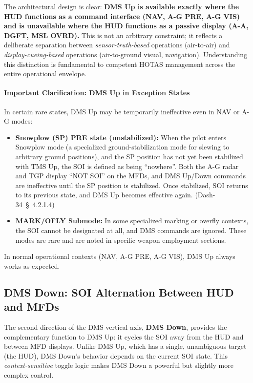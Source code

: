 \documentclass[11pt,a4paper]{article}
\providecommand{\dashref}[1]{Dash-34~\S~#1}
\begin{document}
The architectural design is clear: \textbf{DMS Up is available exactly where the HUD functions as a command interface (NAV, A-G PRE, A-G VIS) and is unavailable where the HUD functions as a passive display (A-A, DGFT, MSL OVRD).} This is not an arbitrary constraint; it reflects a deliberate separation between \textit{sensor-truth-based} operations (air-to-air) and \textit{display-cueing-based} operations (air-to-ground visual, navigation). Understanding this distinction is fundamental to competent HOTAS management across the entire operational envelope.

\paragraph*{Important Clarification: DMS Up in Exception States}

In certain rare states, DMS Up may be temporarily ineffective even in NAV or A-G modes:

\begin{itemize}

\item \textbf{Snowplow (SP) PRE state (unsta­bilized):} When the pilot enters Snowplow mode (a specialized ground-stabilization mode for slewing to arbitrary ground positions), and the SP position has not yet been stabilized with TMS Up, the SOI is defined as being ``nowhere''. Both the A-G radar and TGP display ``NOT SOI'' on the MFDs, and DMS Up/Down commands are ineffective until the SP position is stabilized. Once stabilized, SOI returns to its previous state, and DMS Up becomes effective again. (\dashref{4.2.1.4})

\item \textbf{MARK/OFLY Submode:} In some specialized marking or overfly contexts, the SOI cannot be designated at all, and DMS commands are ignored. These modes are rare and are noted in specific weapon employment sections.

\end{itemize}

In normal operational contexts (NAV, A-G PRE, A-G VIS), DMS Up always works as expected.

\subsection{DMS Down: SOI Alternation Between HUD and MFDs}

\label{sec:C4-S2-S2}

The second direction of the DMS vertical axis, \textbf{DMS Down}, provides the complementary function to DMS Up: it cycles the SOI away from the HUD and between MFD displays. Unlike DMS Up, which has a single, unambiguous target (the HUD), DMS Down's behavior depends on the current SOI state. This \textit{context-sensitive} toggle logic makes DMS Down a powerful but slightly more complex control.
\end{document}
